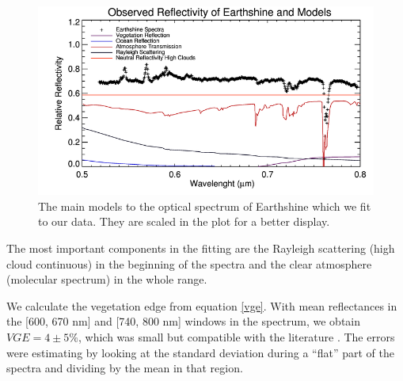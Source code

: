 \begin{figure}[htb]
\begin{center}
\includegraphics[scale=0.6]{plots/fit.png}
\caption{The main models to the optical spectrum of Earthshine which we fit
to our data. They are scaled in the plot for a better display.}
\label{models}
\end{center}
\end{figure}


The most important components in the fitting are the Rayleigh scattering
(high cloud continuous) in the beginning of the spectra and the clear atmosphere
(molecular spectrum) in the whole range.

We calculate the vegetation edge from equation
\ref{vge}. With mean reflectances in the [600, 670 nm] and [740, 800 nm]
windows in the spectrum, we obtain
$VGE =4 \pm 5\%$, which was small but compatible with
the literature \cite{USGS}.
The errors were estimating by looking at the standard deviation during
a ``flat'' part of the spectra and dividing by the mean in that region. 








